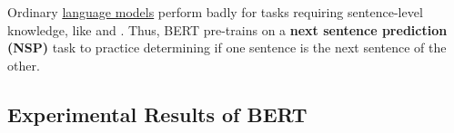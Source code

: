 Ordinary \hyperref[sec:LanguageModels]{language models} perform badly for tasks requiring sentence-level knowledge, like  and . Thus, BERT pre-trains on a \textbf{next sentence prediction (NSP)} task to practice determining if one sentence is the next sentence of the other. 



\subsection{Experimental Results of BERT} \label{sec:BERTExperimentalResults}


